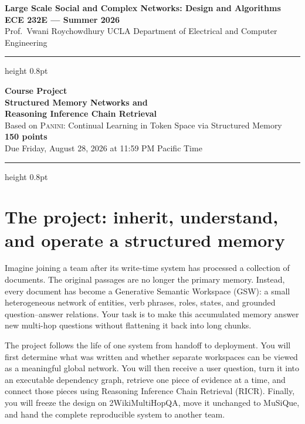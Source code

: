 \documentclass[11pt]{article}
\newcommand{\RICR}{{\mdseries\textsc{RICR}}\xspace}
\newcommand{\PANINI}{{\mdseries\textsc{Panini}}\xspace}
\begin{document}
\begin{center}
{\large\bfseries Large Scale Social and Complex Networks: Design and Algorithms}\\[2pt]
{\large\bfseries ECE 232E --- Summer 2026}\\[3pt]
Prof.\ Vwani Roychowdhury \hfill UCLA Department of Electrical and Computer Engineering
\end{center}
\vspace{2mm}
\hrule height 0.8pt
\vspace{4mm}
\begin{center}
  {\Huge\bfseries Course Project}\\[3pt]
  {\LARGE\bfseries Structured Memory Networks and}\\[2pt]
  {\LARGE\bfseries Reasoning Inference Chain Retrieval}\\[5pt]
  {\large Based on \PANINI: Continual Learning in Token Space via Structured Memory}\\[5pt]
  {\large\bfseries 150 points}\\[2pt]
  {\large Due Friday, August 28, 2026 at 11:59 PM Pacific Time}
\end{center}
\vspace{4mm}
\hrule height 0.8pt
\vspace{5mm}

\section{The project: inherit, understand, and operate a structured memory}

Imagine joining a team after its write-time system has processed a collection
of documents. The original passages are no longer the primary memory.
Instead, every document has become a Generative Semantic Workspace (GSW): a
small heterogeneous network of entities, verb phrases, roles, states, and
grounded question--answer relations. Your task is to make this accumulated
memory answer new multi-hop questions without flattening it back into long
chunks.

The project follows the life of one system from handoff to deployment. You
will first determine what was written and whether separate workspaces can be
viewed as a meaningful global network. You will then receive a user question,
turn it into an executable dependency graph, retrieve one piece of evidence at
a time, and connect those pieces using Reasoning Inference Chain Retrieval
(\RICR). Finally, you will freeze the design on 2WikiMultiHopQA, move it
unchanged to MuSiQue, and hand the complete reproducible system to another
team.
\end{document}
